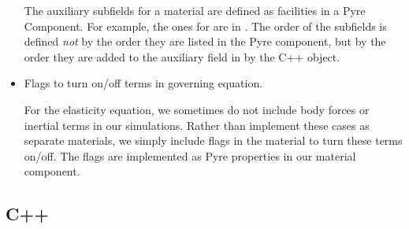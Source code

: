 \begin{itemize}
  The auxiliary subfields for a material are defined as facilities in
  a Pyre Component. For example, the ones for
   are in
  . The order of the subfields
  is defined {\em not} by the order they are listed in the Pyre
  component, but by the order they are added to the auxiliary field in
  by the C++ object. 

\item Flags to turn on/off terms in governing equation.

  For the elasticity equation, we sometimes do not include body forces
  or inertial terms in our simulations. Rather than implement these
  cases as separate materials, we simply include flags in the material
  to turn these terms on/off. The flags are implemented as Pyre
  properties in our material component.
\end{itemize}


\subsection{C++}


